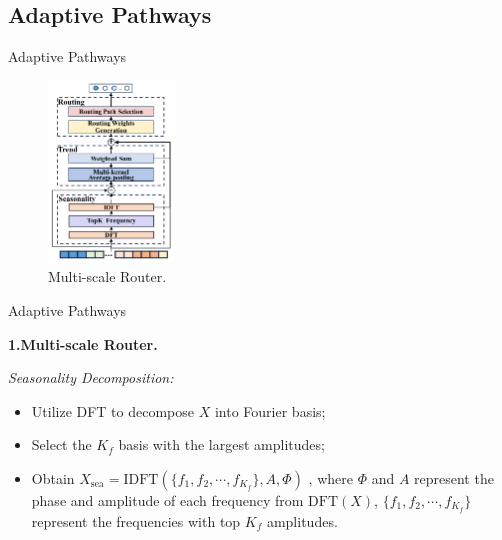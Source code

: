 \documentclass[12pt,aspectratio=169]{beamer}
\begin{document}
\subsection{Adaptive Pathways}

\begin{frame}{Adaptive Pathways}

  \begin{figure}

    \centering
    \includegraphics[width=0.3\textwidth]{fig/multi-scale router.png}
    \caption{Multi-scale Router.}

  \end{figure}

\end{frame}

\begin{frame}{Adaptive Pathways}

  \textbf{1.Multi-scale Router.}

  \textit{\color{ECNURed}Seasonality Decomposition:}

  \begin{itemize}

    \item Utilize DFT to decompose $X$ into Fourier basis;
    \item Select the $K_f$ basis with the largest amplitudes;
    \item Obtain {
      \color{ECNURed}
      $X_\mathrm{sea}=\mathrm{IDFT}\left(\{f_1,f_2,\cdots,f_{K_f}\},A,\Phi\right)$
    }, where $\Phi$ and $A$ represent the phase and amplitude of each frequency
    from $\mathrm{DFT}(X)$, $\{f_1,f_2,\cdots,f_{K_f}\}$ represent the frequencies 
    with top $K_f$ amplitudes.

  \end{itemize}

\end{frame}
\end{document}
